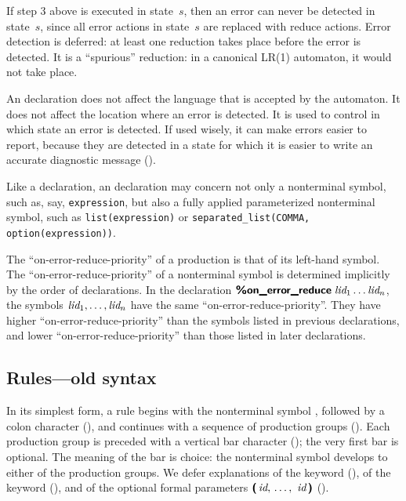 \documentclass[onecolumn,11pt,nocopyrightspace,preprint]{sigplanconf}
\begin{document}
If step 3 above is executed in state~$s$, then an error can never be detected
in state~$s$, since all error actions in state~$s$ are replaced with reduce
actions. Error detection is deferred: at least one reduction takes place
before the error is detected. It is a ``spurious'' reduction: in a canonical
LR(1) automaton, it would not take place.

An \donerrorreduce declaration does not affect the language that is accepted
by the automaton. It does not affect the location where an error is detected.
It is used to control in which state an error is detected. If used wisely, it
can make errors easier to report, because they are detected in a state for
which it is easier to write an accurate diagnostic message
().


Like a \dtype declaration, an \donerrorreduce declaration may concern not only
a nonterminal symbol, such as, say, \texttt{expression}, but also a fully
applied parameterized nonterminal symbol, such as \texttt{list(expression)} or
\texttt{separated\_list(COMMA, option(expression))}.

The ``on-error-reduce-priority'' of a production is that of its left-hand
symbol. The ``on-error-reduce-priority'' of a nonterminal symbol is determined
implicitly by the order of \donerrorreduce declarations. In the declaration
$\text{\upshape\sf\bfseries \%on\_error\_reduce}\;\textit{lid}_1 \ldots \textit{lid}_n$, the symbols $\textit{lid}_1, \ldots,
\textit{lid}_n$ have the same ``on-error-reduce-priority''. They have higher
``on-error-reduce-priority'' than the symbols listed in previous
\donerrorreduce declarations, and lower ``on-error-reduce-priority''
than those listed in later \donerrorreduce declarations.

\subsection{Rules---old syntax}
\label{sec:old:rules}

In its simplest
form, a rule begins with the nonterminal symbol ,
followed by a colon character (\deuxpoints),
and continues with a sequence of production groups
(). Each production group is preceded with a
vertical bar character (\barre); the very first bar is optional. The meaning
of the bar is choice: the nonterminal symbol  develops to either of the
production groups. We defer explanations of the keyword \dpublic
(), of the keyword \dinline (), and of the
optional formal parameters $\tuple{\nt{id}}$
().
\end{document}
